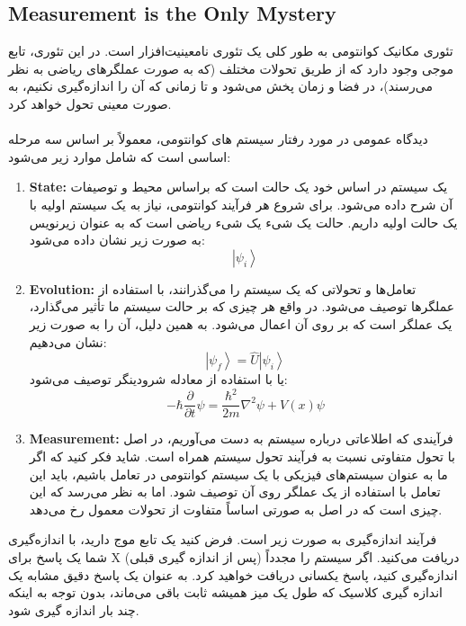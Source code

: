 \documentclass[10pt,a4paper]{article}
\begin{document}
        \subsection{Measurement is the Only Mystery}
تئوری مکانیک کوانتومی به طور کلی یک تئوری نامعینیت‌افزار است. در این تئوری، تابع موجی وجود دارد که از طریق تحولات مختلف (که به صورت عملگرهای ریاضی به نظر می‌رسند)، در فضا و زمان پخش می‌شود و تا زمانی که آن را اندازه‌گیری نکنیم، به صورت معینی تحول خواهد کرد.
            \\
            \\
دیدگاه عمومی در مورد رفتار سیستم های کوانتومی، معمولاً بر اساس سه مرحله اساسی است که شامل موارد زیر می‌شود:
            \begin{enumerate}
                \item \textbf{State:} یک سیستم در اساس خود یک حالت است که براساس محیط و توصیفات آن شرح داده می‌شود. برای شروع هر فرآیند کوانتومی، نیاز به یک سیستم اولیه با یک حالت اولیه داریم. حالت یک شیء یک شیء ریاضی است که به عنوان زیرنویس به صورت زیر نشان داده می‌شود:
                \begin{equation}
                    \left| \psi_i \right> 
                \end{equation}
                \item \textbf{Evolution:} تعامل‌ها و تحولاتی که یک سیستم را می‌گذرانند، با استفاده از عملگرها توصیف می‌شود. در واقع هر چیزی که بر حالت سیستم ما تأثیر می‌گذارد، یک عملگر است که بر روی آن اعمال می‌شود. به همین دلیل، آن را به صورت زیر نشان می‌دهیم:
                \begin{equation}
                    \left|\psi_f\right>  = \hat U \left|\psi_i\right>
                \end{equation}
                یا با استفاده از معادله شرودینگر توصیف می‌شود:
                \begin{equation}
                    -\hbar\frac{\partial}{\partial t} \psi = \frac{\hbar^2}{2m}\nabla^2 \psi + V(x)\psi 
                \end{equation}
                \item \textbf{Measurement:} فرآیندی که اطلاعاتی درباره سیستم به دست می‌آوریم، در اصل با تحول متفاوتی نسبت به فرآیند تحول سیستم همراه است. شاید فکر کنید که اگر ما به عنوان سیستم‌های فیزیکی با یک سیستم کوانتومی در تعامل باشیم، باید این تعامل با استفاده از یک عملگر روی آن توصیف شود. اما به نظر می‌رسد که این چیزی است که در اصل به صورتی اساساً متفاوت از تحولات معمول رخ می‌دهد.
            \end{enumerate}
فرآیند اندازه‌گیری به صورت زیر است. فرض کنید یک تابع موج دارید، با اندازه‌گیری شما یک پاسخ برای X دریافت می‌کنید. اگر سیستم را مجدداً (پس از اندازه گیری قبلی) اندازه‌گیری کنید، پاسخ یکسانی دریافت خواهید کرد. به عنوان یک پاسخ دقیق مشابه یک اندازه گیری کلاسیک که طول یک میز همیشه ثابت باقی می‌ماند، بدون توجه به اینکه چند بار اندازه گیری شود.
\end{document}
